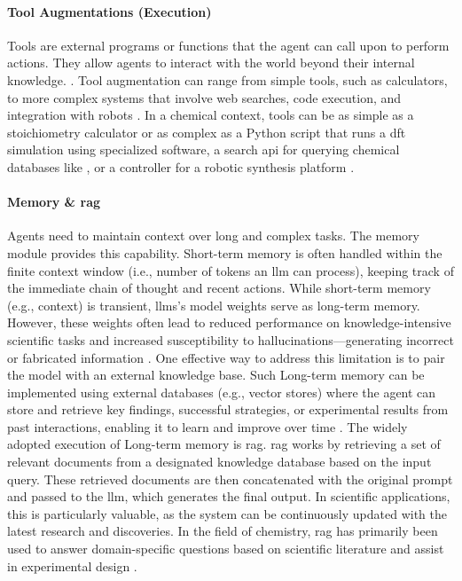 \paragraph{Tool Augmentations (Execution)}
\label{sec:tool_augmentation}
Tools are external programs or functions that the agent can call upon to perform actions. They allow agents to interact with the world beyond their internal knowledge. \autocite{schick2023toolformer, parisi2022talm}. Tool augmentation can range from simple tools, such as calculators, to more complex systems that involve web searches, code execution, and integration with robots \autocite{darvish2025organa, chan2024mle, wei2025browsecomp}. In a chemical context, tools can be as simple as a stoichiometry calculator or as complex as a Python script that runs a \gls{dft} simulation using specialized software, a search \gls{api} for querying chemical databases like , or a controller for a robotic synthesis platform \autocite{boiko2023autonomous, darvish2025organa, bran2024augmenting}.

\paragraph{Memory \& \gls{rag} }
\label{sec:rag}
Agents need to maintain context over long and complex tasks. The memory module provides this capability. Short-term memory is often handled within the finite context window (i.e., number of tokens an \gls{llm} can process), keeping track of the immediate chain of thought and recent actions.
While short-term memory (e.g., context) is transient, \glspl{llm}'s model weights serve as long-term memory. However, these weights often lead to reduced performance on knowledge-intensive scientific tasks and increased susceptibility to hallucinations---generating incorrect or fabricated information \autocite{marcus2020next}.
One effective way to address this limitation is to pair the model with an external knowledge base.\autocite{lewis2020retrieval} Such Long-term memory can be implemented using external databases (e.g., vector stores) where the agent can store and retrieve key findings, successful strategies, or experimental results from past interactions, enabling it to learn and improve over time \autocite{chen2023chemist}. The widely adopted execution of Long-term memory is \gls{rag}. \gls{rag} works by retrieving a set of relevant documents from a designated knowledge database based on the input query. These retrieved documents are then concatenated with the original prompt and passed to the \gls{llm}, which generates the final output.  In scientific applications, this is particularly valuable, as the system can be continuously updated with the latest research and discoveries. In the field of chemistry, \gls{rag} has primarily been used to answer domain-specific questions based on scientific literature and assist in experimental design \autocite{chen2023chemist, skarlinski2024language}.


